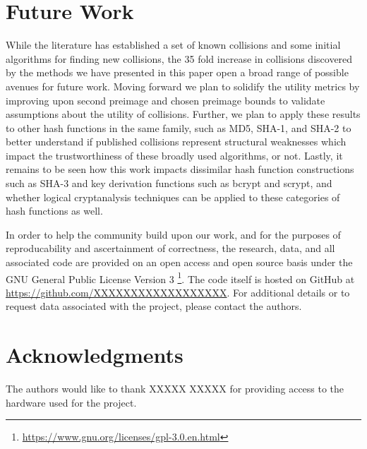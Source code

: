 \documentclass[conference]{IEEEtran}
\begin{document}
\section{Future Work} \label{Sec:Future}

While the literature has established a set of known collisions and
some initial algorithms for finding new collisions, the 35 fold
increase in collisions discovered by the methods we have presented in
this paper open a broad range of possible avenues for future work.
Moving forward we plan to solidify the utility metrics by improving upon
second preimage and chosen preimage bounds to validate assumptions about the
utility of collisions. Further, we plan to apply these results to other hash
functions in the same family, such as MD5, SHA-1, and SHA-2 to better
understand if published collisions represent structural weaknesses
which impact the trustworthiness of these broadly used algorithms, or not. Lastly, it
remains to be seen how this work impacts dissimilar hash function constructions such as
SHA-3 and key derivation functions such as bcrypt and scrypt, and whether
logical cryptanalysis techniques can be applied to these categories of
hash functions as well.

In order to help the community build upon our work, and for the
purposes of reproducability and ascertainment of correctness, the
research, data, and all associated code are provided on an open access
and open source basis under the GNU General Public License Version 3
\footnote{\url{https://www.gnu.org/licenses/gpl-3.0.en.html}}.
The code itself is hosted on GitHub at \url{https://github.com/XXXXXXXXXXXXXXXXXX}.
For additional details or to request data associated with the project, please
contact the authors.



\section*{Acknowledgments}

The authors would like to thank XXXXX XXXXX for providing access to
the hardware used for the project.














\end{document}
